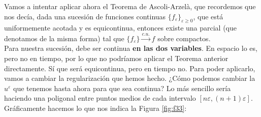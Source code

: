 Vamos a intentar aplicar ahora el Teorema de Ascoli-Arzelà, que recordemos que nos decía, dada una sucesión de funciones continuas
$\{f_\varepsilon\}_{\varepsilon \geq 0}$, que está uniformemente acotada y es equicontinua, entonces existe una parcial (que denotamos 
de la misma forma) tal que $\{f_\varepsilon\} \stackrel{c.u.}{\to} f$ sobre compactos. \\

Para nuestra sucesión, debe ser continua \textbf{en las dos variables}. En espacio lo es, pero no en tiempo, por lo que no podríamos 
aplicar el Teorema anterior directamente. Sí que será equicontinua, pero en tiempo no. Para poder aplicarlo, vamos a cambiar la regularización 
que hemos hecho. ¿Cómo podemos cambiar la $u^\varepsilon$ que tenemos hasta ahora para que sea continua? Lo más sencillo sería haciendo una 
poligonal entre puntos medios de cada intervalo $[n \varepsilon, (n+1)\varepsilon]$. Gráficamente hacemos lo que nos indica la Figura \ref{fig:f33}:

